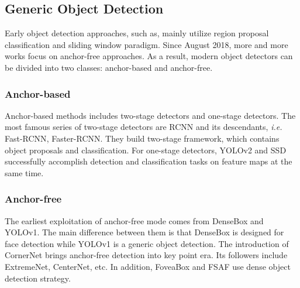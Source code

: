 \documentclass[twocolumn]{article}
\begin{document}
\subsection{Generic Object Detection}
Early object detection approaches, such as\cite{viola2001robust, lienhart2002extended, dollar2014fast}, mainly utilize region proposal classification and sliding window paradigm. Since August 2018, more and more works focus on anchor-free approaches. As a result, modern object detectors can be divided into two classes: anchor-based and anchor-free.
\subsubsection{Anchor-based}
Anchor-based methods includes two-stage detectors and one-stage detectors. The most famous series of two-stage detectors are RCNN\cite{girshick2014rich} and its descendants, \textit{i.e.} Fast-RCNN\cite{girshick2015fast}, Faster-RCNN\cite{ren2015faster}. They build two-stage framework, which contains object proposals and classification. For one-stage detectors, YOLOv2\cite{redmon2017yolo9000} and SSD\cite{liu2016ssd} successfully accomplish detection and classification tasks on feature maps at the same time.
\subsubsection{Anchor-free}
The earliest exploitation of anchor-free mode comes from DenseBox\cite{huang2015densebox} and YOLOv1\cite{redmon2016you}. The main difference between them is that DenseBox is designed for face detection while YOLOv1 is a generic object detection. The introduction of CornerNet\cite{law2018cornernet} brings anchor-free detection into key point era. Its followers include ExtremeNet\cite{zhou2019bottom}, CenterNet\cite{zhou2019objects}, etc. In addition, FoveaBox\cite{kong2019foveabox} and FSAF\cite{zhu2019feature} use dense object detection strategy.
\end{document}
